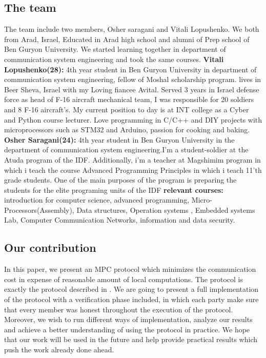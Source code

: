 \documentclass[12pt]{article}
\begin{document}
\subsection{The team}
The team include two members, Osher saragani and Vitali Lopushenko. We both from Arad, Israel, Educated in Arad high school and alumni of Prep school of Ben Guryon University. We started learning together in department of communication system engineering and took the same courses.
\hfill\break\hfill\break
\textbf{Vitali Lopushenko(28):}
4th year student in Ben Guryon University in department of communication system engineering, fellow of Moshal scholarship program. lives in Beer Sheva, Israel with my Loving fiancee Avital. Served 3 years in Israel defense force as head of F-16 aircraft mechanical team, I was responsible 
for 20 soldiers and 8 F-16 aircraft's. My current position to day is at INT college as a Cyber and Python course lecturer.
Love programming in C/C++ and DIY projects with microprocessors such as STM32 and Arduino, passion for cooking and baking.
\hfill\break \hfill\break 
\textbf{Osher Saragani(24):}
4th year student in Ben Guryon University in the department of communication system engineering.I’m a student-soldier at the Atuda program of the IDF. Additionally, i’m a teacher at Magshimim program in which  i teach the course Advanced Programming Principles in which i teach 11’th grade students. One of the main purposes of the program is preparing the  students for the elite programing units of the IDF
\hfill\break\hfill\break
\textbf{relevant courses:} introduction for computer science, advanced programming, Micro-Processors(Assembly), Data structures, Operation systems , Embedded systems Lab, Computer Communication Networks, information and data security. 

\subsection{Our contribution}
In this paper, we present an MPC protocol which minimizes the communication cost in expense of reasonable amount of local computations. The protocol is exactly the protocol described in \cite{main}. We are going to  present a full implementation of the protocol with a verification phase included, in which each party make sure that every member was honest throughout the execution of the protocol.
Moreover, we wish to run different ways of implementation, analyze our results and achieve a better understanding of using the protocol in practice. We hope that our work will be used in the future and help provide practical results which push the work already done ahead.
 
\end{document}
